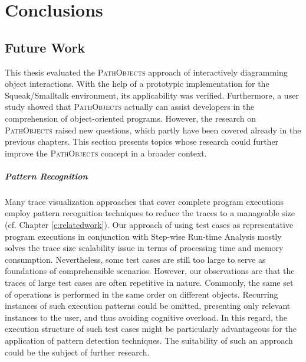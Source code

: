 \chapter{Conclusions}
\label{c:conclusions}

\section{Future Work}
\label{s:ConclusionsFuture}

This thesis evaluated the \textsc{PathObjects} approach of interactively diagramming object interactions.
With the help of a prototypic implementation for the Squeak/Smalltalk environment, its applicability was verified.
Furthermore, a user study showed that \textsc{PathObjects} actually can assist developers in the comprehension of object-oriented programs.
However, the research on \textsc{PathObjects} raised new questions, which partly have  been covered already in the previous chapters.
This section presents topics whose research could further improve the \textsc{PathObjects} concept in a broader context.

\paragraph{Pattern Recognition} Many trace visualization approaches that cover complete program executions employ pattern recognition techniques to reduce the traces to a manageable size (cf. Chapter \ref{c:relatedwork}).
Our approach of using test cases as representative program executions in conjunction with Step-wise Run-time Analysis mostly solves the trace size scalability issue in terms of processing time and memory consumption.
Nevertheless, some test cases are still too large to serve as foundations of comprehensible scenarios.
However, our observations are that the traces of large test cases are often repetitive in nature. Commonly, the same set of operations is performed in the same order on different objects.
Recurring instances of such execution patterns could be omitted, presenting only relevant instances to the user, and thus avoiding cognitive overload.
In this regard, the execution structure of such test cases might be particularly advantageous for the application of pattern detection techniques.
The suitability of such an approach could be the subject of further research.

